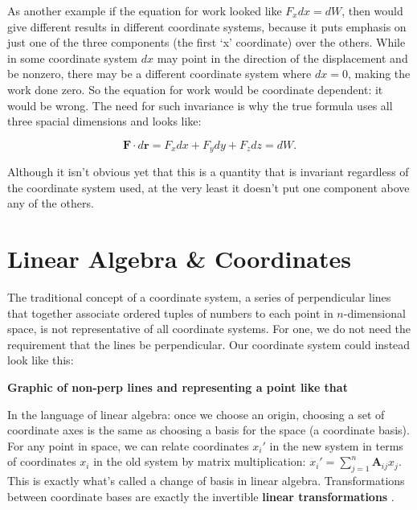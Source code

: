 	
	As another example if the equation for work looked like $F_x dx = dW$, then would give different results in different coordinate systems, because it puts emphasis on just one of the three components (the first `x' coordinate) over the others. While in some coordinate system $dx$ may point in the direction of the displacement and be nonzero, there may be a different coordinate system where $dx=0$, making the work done zero. So the equation for work would be coordinate dependent: it would be wrong. The need for such invariance is why the true formula uses all three spacial dimensions and looks like:
	
	\begin{equation*}
		\mathbf F \cdot  d \mathbf r = F_x dx + F_y dy + F_z dz = d W.
	\end{equation*}
	
	 Although it isn't obvious yet that this is a quantity that is invariant regardless of the coordinate system used, at the very least it doesn't put one component above any of the others.

	
	
	\section{Linear Algebra \& Coordinates} 
	\label{sec:Linear Algebra & Coordinates}%
	
	
	The traditional concept of a coordinate system, a series of perpendicular lines that together associate ordered tuples of numbers to each point in $n$-dimensional space, is not representative of all coordinate systems. For one, we do not need the requirement that the lines be perpendicular. Our coordinate system could instead look like this:
	
	\textbf{Graphic of non-perp lines and representing a point like that}
	
	In the language of linear algebra: once we choose an origin, choosing a set of coordinate axes is the same as choosing a basis for the space (a coordinate basis). For any point in space, we can relate coordinates $x_i'$ in the new system in terms of coordinates $x_i$ in the old system by matrix multiplication: $x_i' = \sum_{j=1}^n \mathbf A_{ij} x_j$. This is exactly what's called a change of basis in linear algebra. Transformations between coordinate bases are exactly the invertible \textbf{linear transformations} .
	
